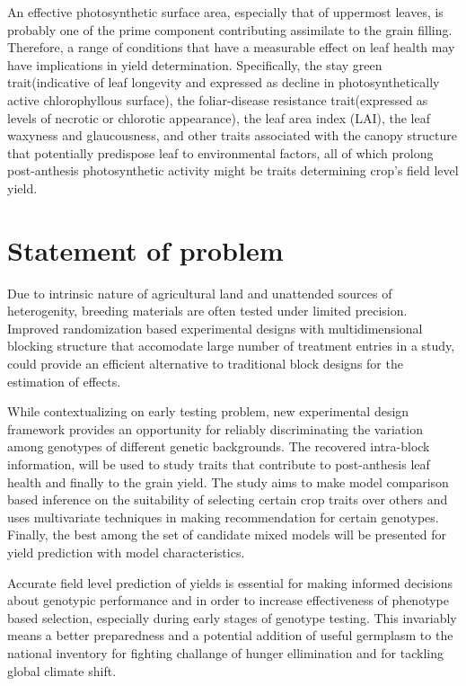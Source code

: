\documentclass[12pt,oneside]{dukestatscithesis} %
\theoremstyle{definition}
\theoremstyle{definition}
\theoremstyle{definition}
\theoremstyle{remark}
\begin{document}
An effective photosynthetic surface area, especially that of uppermost
leaves, is probably one of the prime component contributing assimilate
to the grain filling. Therefore, a range of conditions that have a
measurable effect on leaf health may have implications in yield
determination. Specifically, the stay green trait(indicative of leaf
longevity and expressed as decline in photosynthetically active
chlorophyllous surface), the foliar-disease resistance trait(expressed
as levels of necrotic or chlorotic appearance), the leaf area index
(LAI), the leaf waxyness and glaucousness, and other traits associated
with the canopy structure that potentially predispose leaf to
environmental factors, all of which prolong post-anthesis photosynthetic
activity might be traits determining crop's field level yield.

\section{Statement of problem}\label{statement-of-problem}

Due to intrinsic nature of agricultural land and unattended sources of
heterogenity, breeding materials are often tested under limited
precision. Improved randomization based experimental designs with
multidimensional blocking structure that accomodate large number of
treatment entries in a study, could provide an efficient alternative to
traditional block designs for the estimation of effects.

While contextualizing on early testing problem, new experimental design
framework provides an opportunity for reliably discriminating the
variation among genotypes of different genetic backgrounds. The
recovered intra-block information, will be used to study traits that
contribute to post-anthesis leaf health and finally to the grain yield.
The study aims to make model comparison based inference on the
suitability of selecting certain crop traits over others and uses
multivariate techniques in making recommendation for certain genotypes.
Finally, the best among the set of candidate mixed models will be
presented for yield prediction with model characteristics.

Accurate field level prediction of yields is essential for making
informed decisions about genotypic performance and in order to increase
effectiveness of phenotype based selection, especially during early
stages of genotype testing. This invariably means a better preparedness
and a potential addition of useful germplasm to the national inventory
for fighting challange of hunger ellimination and for tackling global
climate shift.
\end{document}
